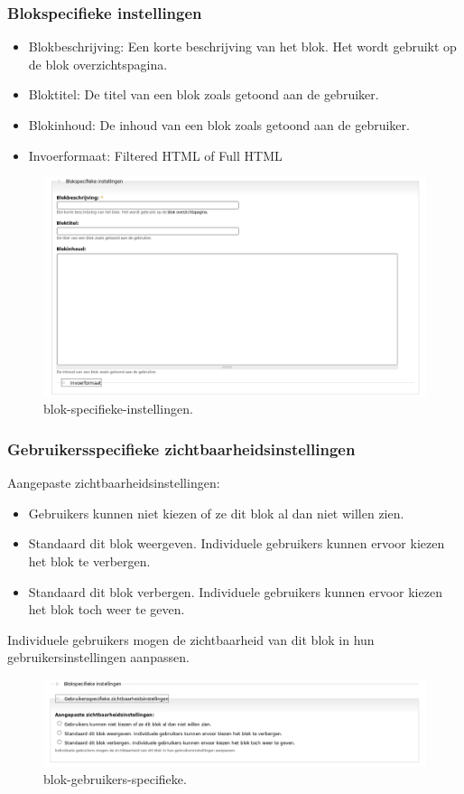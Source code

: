 \subsubsection{Blokspecifieke instellingen} 
\begin{itemize}
\item Blokbeschrijving: Een korte beschrijving van het blok. Het wordt gebruikt op de blok overzichtspagina.
\item Bloktitel: De titel van een blok zoals getoond aan de gebruiker.
\item Blokinhoud: De inhoud van een blok zoals getoond aan de gebruiker.
\item Invoerformaat: Filtered HTML of Full HTML
\end{itemize}
 \begin{figure}[!h]
    \centering
   \includegraphics[scale=0.3,angle=0]{blok-specifieke-instellingen}
   \caption{blok-specifieke-instellingen.\label{white}}
 \end{figure}
\subsubsection{Gebruikersspecifieke zichtbaarheidsinstellingen}
 Aangepaste zichtbaarheidsinstellingen: 
\begin{itemize}
\item Gebruikers kunnen niet kiezen of ze dit blok al dan niet willen zien.
\item Standaard dit blok weergeven. Individuele gebruikers kunnen ervoor kiezen het blok te verbergen.
\item Standaard dit blok verbergen. Individuele gebruikers kunnen ervoor kiezen het blok toch weer te geven.
\end{itemize}
Individuele gebruikers mogen de zichtbaarheid van dit blok in hun
gebruikersinstellingen aanpassen. 
\begin{figure}[!h]
    \centering
   \includegraphics[scale=0.3,angle=0]{blok-gebruikers-specifieke}
   \caption{blok-gebruikers-specifieke.\label{white}}
 \end{figure} 
